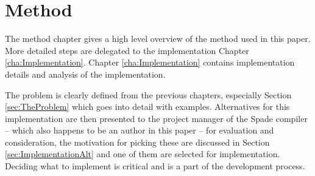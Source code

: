 \documentclass[msc,lith,english]{liuthesis}
\begin{document}
\cite{src:HLSandOpt}





\chapter{Method}
The method chapter gives a high level overview of the method used in this paper. More detailed steps are delegated to the implementation Chapter \ref{cha:Implementation}. Chapter \ref{cha:Implementation} contains implementation details and analysis of the implementation.

The problem is clearly defined from the previous chapters, especially Section \ref{sec:TheProblem} which goes into detail with examples. Alternatives for this implementation are then presented to the project manager of the Spade compiler -- which also happens to be an author in this paper -- for evaluation and consideration, the motivation for picking these are discussed in Section \ref{sec:ImplementationAlt} and one of them are selected for implementation. Deciding what to implement is critical and is a part of the development process.
\end{document}
